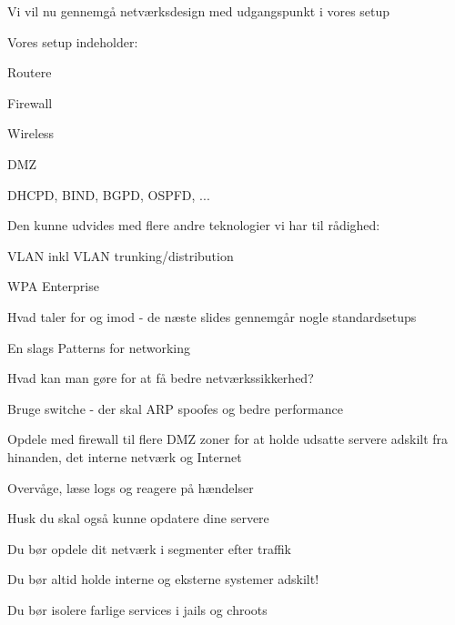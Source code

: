 \documentclass[Screen16to9,17pt]{foils}
\begin{document}
\begin{list1}
\item Vi vil nu gennemgå netværksdesign med udgangspunkt i vores setup
\item Vores setup indeholder:
\begin{list2}
\item Routere
\item Firewall
\item Wireless
\item DMZ
\item DHCPD, BIND, BGPD, OSPFD, ...
\end{list2}
\item Den kunne udvides med flere andre teknologier vi har til rådighed:
\begin{list2}
\item VLAN inkl VLAN trunking/distribution
\item WPA Enterprise
\end{list2}
\item Hvad taler for og imod - de næste slides gennemgår nogle standardsetups
\item En slags Patterns for networking
\end{list1}






\begin{list1}
\item Hvad kan man gøre for at få bedre netværkssikkerhed?
\begin{list2}
\item Bruge switche - der skal ARP spoofes og bedre performance
\item Opdele med firewall til flere DMZ zoner for at holde
      udsatte servere adskilt fra hinanden, det interne netværk og
      Internet
\item Overvåge, læse logs og reagere på hændelser
\end{list2}
\item Husk du skal også kunne opdatere dine servere
\end{list1}



\begin{list1}
\item Du bør opdele dit netværk i segmenter efter traffik
\item Du bør altid holde interne og eksterne systemer adskilt!
\item Du bør isolere farlige services i jails og chroots
\end{list1}
\end{document}
